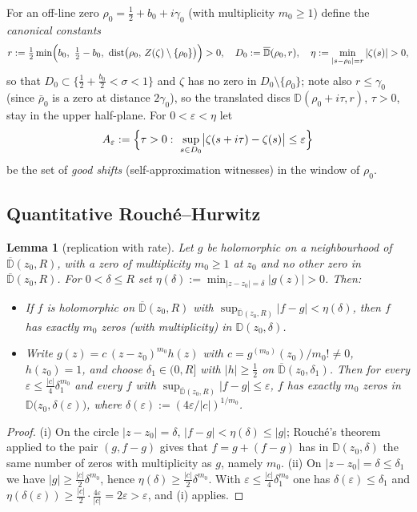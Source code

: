 \documentclass[11pt]{amsart}
\theoremstyle{plain}
\newtheorem{lemma}[theorem]{Lemma}
\theoremstyle{definition}
\theoremstyle{remark}
\begin{document}
For an off-line zero $\rho_0=\tfrac12+b_0+i\gamma_0$ (with multiplicity $m_0\ge1$) define the \emph{canonical constants}
\[
r:=\tfrac12\min\Bigl(b_0,\ \tfrac12-b_0,\ \operatorname{dist}\bigl(\rho_0,\,Z(\zeta)\setminus\{\rho_0\}\bigr)\Bigr)>0,
\quad
D_0:=\overline{\mathbb D}(\rho_0,r),
\quad
\eta:=\min_{|s-\rho_0|=r}|\zeta(s)|>0,
\]
so that $D_0\subset\{\tfrac12+\tfrac{b_0}2<\sigma<1\}$ and $\zeta$ has no zero in $D_0\setminus\{\rho_0\}$; note also $r\le\gamma_0$ (since $\bar\rho_0$ is a zero at distance $2\gamma_0$), so the translated discs $\mathbb D(\rho_0+i\tau,r)$, $\tau>0$, stay in the upper half-plane. For $0<\varepsilon<\eta$ let
\[
A_\varepsilon:=\Bigl\{\tau>0:\ \sup_{s\in D_0}\bigl|\zeta(s+i\tau)-\zeta(s)\bigr|\le\varepsilon\Bigr\}
\]
be the set of \emph{good shifts} (self-approximation witnesses) in the window of $\rho_0$.

\subsection{Quantitative Rouch\'e--Hurwitz}

\begin{lemma}[replication with rate]\label{lem:rouche}
Let $g$ be holomorphic on a neighbourhood of $\overline{\mathbb D}(z_0,R)$, with a zero of multiplicity $m_0\ge1$ at $z_0$ and no other zero in $\overline{\mathbb D}(z_0,R)$. For $0<\delta\le R$ set $\eta(\delta):=\min_{|z-z_0|=\delta}|g(z)|>0$. Then:
\begin{itemize}
\item[\textup{(i)}] If $f$ is holomorphic on $\overline{\mathbb D}(z_0,R)$ with $\sup_{\overline{\mathbb D}(z_0,R)}|f-g|<\eta(\delta)$, then $f$ has exactly $m_0$ zeros (with multiplicity) in $\mathbb D(z_0,\delta)$.
\item[\textup{(ii)}] Write $g(z)=c\,(z-z_0)^{m_0}h(z)$ with $c=g^{(m_0)}(z_0)/m_0!\ne0$, $h(z_0)=1$, and choose $\delta_1\in(0,R]$ with $|h|\ge\tfrac12$ on $\overline{\mathbb D}(z_0,\delta_1)$. Then for every $\varepsilon\le\tfrac{|c|}{4}\delta_1^{m_0}$ and every $f$ with $\sup_{\overline{\mathbb D}(z_0,R)}|f-g|\le\varepsilon$, $f$ has exactly $m_0$ zeros in $\mathbb D\bigl(z_0,\delta(\varepsilon)\bigr)$, where $\delta(\varepsilon):=(4\varepsilon/|c|)^{1/m_0}$.
\end{itemize}
\end{lemma}

\begin{proof}
(i) On the circle $|z-z_0|=\delta$, $|f-g|<\eta(\delta)\le|g|$; Rouch\'e's theorem applied to the pair $(g,f-g)$ gives that $f=g+(f-g)$ has in $\mathbb D(z_0,\delta)$ the same number of zeros with multiplicity as $g$, namely $m_0$. (ii) On $|z-z_0|=\delta\le\delta_1$ we have $|g|\ge\tfrac{|c|}2\delta^{m_0}$, hence $\eta(\delta)\ge\tfrac{|c|}2\delta^{m_0}$. With $\varepsilon\le\tfrac{|c|}4\delta_1^{m_0}$ one has $\delta(\varepsilon)\le\delta_1$ and $\eta(\delta(\varepsilon))\ge\tfrac{|c|}2\cdot\tfrac{4\varepsilon}{|c|}=2\varepsilon>\varepsilon$, and (i) applies.
\end{proof}
\end{document}
